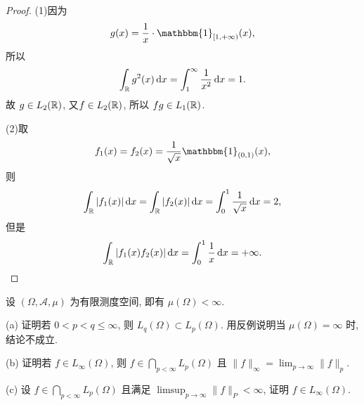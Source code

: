 \begin{proof}
(1)因为
\[g(x)=\frac{1}{x}\cdot\mathbbm{1}_{[1,+\infty)}(x),\]
所以
\[\int_{\mathbb{R}} g^2(x)\mathop{}\!\mathrm{d} x=\int_1^{\infty}\frac{1}{x^2}\mathop{}\!\mathrm{d} x=1.\]
故 $g\in L_2(\mathbb{R})$, 又$f\in L_2(\mathbb{R})$, 所以 $fg\in L_1(\mathbb{R})$.

(2)取
\[f_1(x)=f_2(x)=\frac{1}{\sqrt{x}}\mathbbm{1}_{(0,1)}(x),\]
则
\[\int_{\mathbb{R}} |f_1(x)|\mathop{}\!\mathrm{d} x=\int_{\mathbb{R}} |f_2(x)|\mathop{}\!\mathrm{d} x=\int_0^1\frac{1}{\sqrt{x}}\mathop{}\!\mathrm{d} x=2,\]
但是
\[\int_{\mathbb{R}} |f_1(x)f_2(x)|\mathop{}\!\mathrm{d} x=\int_0^1\frac{1}{x}\mathop{}\!\mathrm{d} x=+\infty.\qedhere\]
\end{proof}




\begin{exercise}
    设 $(\varOmega,\mathcal{A},\mu)$ 为有限测度空间, 即有 $\mu(\varOmega)<\infty$.

    (a) 证明若 $0<p<q\leq\infty$, 则 $L_q(\varOmega)\subset L_p(\varOmega)$.
    用反例说明当 $\mu(\varOmega)=\infty$ 时, 结论不成立.

    (b) 证明若 $f\in L_{\infty}(\varOmega)$, 则 $f\in\bigcap\limits_{p<\infty}L_p(\varOmega)$
    且 $\|f\|_{\infty}=\lim_{p\to\infty}\|f\|_{p}$.

    (c) 设 $f\in\bigcap\limits_{p<\infty}L_p(\varOmega)$ 且满足 $\limsup_{p\to\infty}\|f\|_P<\infty$,
    证明 $f\in L_{\infty}(\varOmega)$.
\end{exercise}

